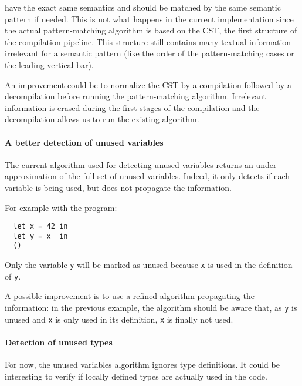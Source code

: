 \documentclass[10pt,a4paper]{article}
\begin{document}
have the exact same semantics and should be matched by the same
semantic pattern if needed. This is not what happens in the current
implementation since the actual pattern-matching algorithm is based on
the CST, the first structure of the compilation pipeline. This
structure still contains many textual information irrelevant for a
semantic pattern (like the order of the pattern-matching cases or the
leading vertical bar).

An improvement could be to normalize the CST by a compilation followed
by a decompilation before running the pattern-matching
algorithm. Irrelevant information is erased during the first stages of
the compilation and the decompilation allows us to run the existing
algorithm.

\paragraph{A better detection of unused variables}

The current algorithm used for detecting unused variables returns an
under-approximation of the full set of unused variables. Indeed, it
only detects if each variable is being used, but does not propagate
the information.

For example with the program:
\begin{verbatim}
  let x = 42 in
  let y = x  in
  ()
\end{verbatim}

Only the variable \verb|y| will be marked as unused because
\verb|x| is used in the definition of \verb|y|.

A possible improvement is to use a refined algorithm propagating the
information: in the previous example, the algorithm should be aware
that, as \verb|y| is unused and \verb|x| is only used in its
definition, \verb|x| is finally not used.

\paragraph{Detection of unused types}

For now, the unused variables algorithm ignores type definitions. It
could be interesting to verify if locally defined types are actually
used in the code.
\end{document}
